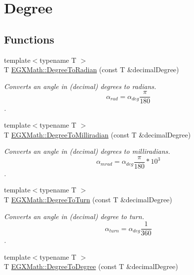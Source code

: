 \hypertarget{group___e_g_x_math-_angle_conversions-_degree}{}\section{Degree}
\label{group___e_g_x_math-_angle_conversions-_degree}
\subsection*{Functions}
\begin{DoxyCompactItemize}
\item 
{\footnotesize template$<$typename T $>$ }\\T \mbox{\hyperlink{group___e_g_x_math-_angle_conversions-_degree_ga48585541b228c852c9d08a9eac3682f0}{E\+G\+X\+Math\+::\+Degree\+To\+Radian}} (const T \&decimal\+Degree)
\begin{DoxyCompactList}\small\item\em Converts an angle in (decimal) degrees to radians. \[\alpha_{rad}=\alpha_{deg}\frac{\pi}{180}\]. \end{DoxyCompactList}\item 
{\footnotesize template$<$typename T $>$ }\\T \mbox{\hyperlink{group___e_g_x_math-_angle_conversions-_degree_gae4fa6c2d3805430760783650cfbfdb11}{E\+G\+X\+Math\+::\+Degree\+To\+Milliradian}} (const T \&decimal\+Degree)
\begin{DoxyCompactList}\small\item\em Converts an angle in (decimal) degrees to milliradians. \[\alpha_{mrad}=\alpha_{deg}\frac{\pi}{180}*10^3\]. \end{DoxyCompactList}\item 
{\footnotesize template$<$typename T $>$ }\\T \mbox{\hyperlink{group___e_g_x_math-_angle_conversions-_degree_gafb4ce930493a7d6202ede3ee1630ef5d}{E\+G\+X\+Math\+::\+Degree\+To\+Turn}} (const T \&decimal\+Degree)
\begin{DoxyCompactList}\small\item\em Converts an angle in (decimal) degree to turn. \[\alpha_{turn}=\alpha_{deg}\frac{1}{360}\]. \end{DoxyCompactList}\item 
{\footnotesize template$<$typename T $>$ }\\T \mbox{\hyperlink{group___e_g_x_math-_angle_conversions-_degree_gaca157e7d3e99a46a11a04b92680d2574}{E\+G\+X\+Math\+::\+Degree\+To\+Degree}} (const T \&decimal\+Degree)

\end{DoxyCompactItemize}
